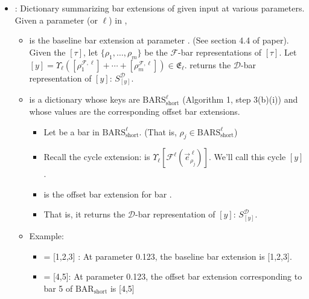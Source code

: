 \documentclass{article}
\begin{document}
\begin{itemize}
\item {}: Dictionary summarizing bar extensions of given input at various parameters.  Given a parameter  (or $\ell$) in , 
	\begin{itemize}
	\item {} is the baseline bar extension at parameter . (See section 4.4 of paper).  Given the  $[\tau]$, let $\{ \rho_1, \dots, \rho_m \}$ be the $\mathcal{F}$-bar representations of $[\tau]$. Let $[y] = \Upsilon_{\ell}([\rho_1^{\mathcal{F}, \ell}] + \cdots + [\rho_m^{\mathcal{F}, \ell}]) \in \mathfrak{E}_{\ell}$.  returns the $\mathcal{D}$-bar representation of $[y]$: $S^{\mathcal{D}}_{[y]}$.
	\item {} is a dictionary whose keys are $\text{BARS}_{\text{short}}^{\ell}$ (Algorithm 1, step 3(b)(i)) and whose values are the corresponding offset bar extensions.	
	\begin{itemize}
	\item Let   be a bar in $\text{BARS}_{\text{short}}^{\ell}$. (That is, $\rho_j \in \text{BARS}_{\text{short}}^{\ell}$) %
	\item Recall the cycle extension:  is  $\Upsilon_{\ell} [\mathcal{F}^{\ell} (\vec{e}^{\; \ell}_{\rho_j})]$. We'll call this cycle $[y]$.
	\item 	{} is the offset bar extension for bar . 
	\item That is, it returns the $\mathcal{D}$-bar representation of $[y]$: $S^{\mathcal{D}}_{[y]}$. 
	\end{itemize}
	\item Example:
		\begin{itemize}
		\item {} = [1,2,3] : At parameter 0.123, the baseline bar extension is [1,2,3].
		\item {} = [4,5]: At parameter 0.123, the offset bar extension corresponding to bar 5 of $\text{BAR}_{\text{short}}$ is [4,5]
		\end{itemize}
	\end{itemize}

\end{itemize}
\end{document}
